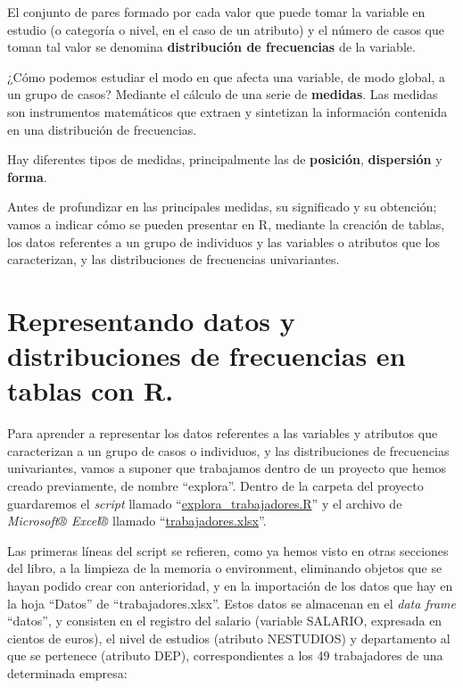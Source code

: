 \documentclass[
]{book}
\begin{document}
El conjunto de pares formado por cada valor que puede tomar la variable en estudio (o categoría o nivel, en el caso de un atributo) y el número de casos que toman tal valor se denomina \textbf{distribución de frecuencias} de la variable.

¿Cómo podemos estudiar el modo en que afecta una variable, de modo global, a un grupo de casos?
Mediante el cálculo de una serie de \textbf{medidas}.
Las medidas son instrumentos matemáticos que extraen y sintetizan la información contenida en una distribución de frecuencias.

Hay diferentes tipos de medidas, principalmente las de \textbf{posición}, \textbf{dispersión} y \textbf{forma}.

Antes de profundizar en las principales medidas, su significado y su obtención; vamos a indicar cómo se pueden presentar en R, mediante la creación de tablas, los datos referentes a un grupo de individuos y las variables o atributos que los caracterizan, y las distribuciones de frecuencias univariantes.

\section{Representando datos y distribuciones de frecuencias en tablas con R.}\label{representando-datos-y-distribuciones-de-frecuencias-en-tablas-con-r.}

Para aprender a representar los datos referentes a las variables y atributos que caracterizan a un grupo de casos o individuos, y las distribuciones de frecuencias univariantes, vamos a suponer que trabajamos dentro de un proyecto que hemos creado previamente, de nombre ``explora''.
Dentro de la carpeta del proyecto guardaremos el \emph{script} llamado ``\href{https://drive.google.com/file/d/1pfyGPGQRmgOyo9wrZ7fr_KAFj49ecXID/view?usp=sharing}{explora\_trabajadores.R}'' y el archivo de \emph{Microsoft® Excel®} llamado ``\href{https://docs.google.com/spreadsheets/d/1e_h8P_0sBuD5Nvw6nkeWtXXeiqItFfdI/edit?usp=sharing&ouid=115375878280465826079&rtpof=true&sd=true}{trabajadores.xlsx}''.

Las primeras líneas del script se refieren, como ya hemos visto en otras secciones del libro, a la limpieza de la memoria o environment, eliminando objetos que se hayan podido crear con anterioridad, y en la importación de los datos que hay en la hoja ``Datos'' de ``trabajadores.xlsx''.
Estos datos se almacenan en el \emph{data frame} ``datos'', y consisten en el registro del salario (variable SALARIO, expresada en cientos de euros), el nivel de estudios (atributo NESTUDIOS) y departamento al que se pertenece (atributo DEP), correspondientes a los 49 trabajadores de una determinada empresa:
\end{document}
